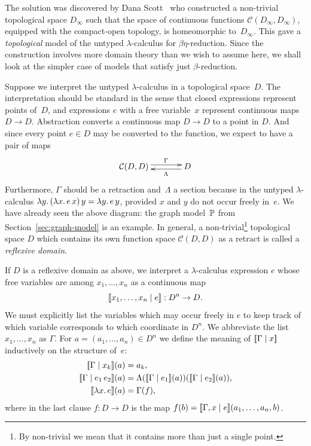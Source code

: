 The solution was discovered by Dana Scott~\cite{scott72:_contin_lattic} who
constructed a non-trivial topological space $D_\infty$ such that the
space of continuous functions $\mathcal{C}(D_\infty, D_\infty)$,
equipped with the compact-open topology, is homeomorphic
to~$D_\infty$. This gave a \emph{topological} model of the untyped
$\lambda$-calculus for $\beta\eta$-reduction. Since the construction
involves more domain theory than we wish to assume here, we shall look
at the simpler case of models that satisfy just $\beta$-reduction.

Suppose we interpret the untyped $\lambda$-calculus in a topological
space~$D$. The interpretation should be standard in the sense that
closed expressions represent points of~$D$, and expressions $e$ with a
free variable~$x$ represent continuous maps $D \to D$. Abstraction
converts a continuous map $D \to D$ to a point in $D$. And since every
point $e \in D$ may be converted to the function, we expect to have a
pair of maps
%
\begin{equation*}
  \xymatrix{
    **[l]{\mathcal{C}(D, D)}
    \ar@<+0.25em>[r]^{\Gamma}
    &
    {D}
    \ar@<+0.25em>[l]^{\Lambda}
  }
\end{equation*}
%
Furthermore, $\Gamma$ should be a retraction and~$\Lambda$ a section
because in the untyped $\lambda$-calculus
$\lambda y .\,(\lambda x .\,e\,x)\, y = \lambda y .\,e\,y$, provided $x$ and
$y$ do not occur freely in~$e$. We have already seen the above
diagram: the graph model~$\mathbb{P}$ from Section~\ref{sec:graph-model}
is an example. In general, a non-trivial\footnote{By non-trivial we
  mean that it contains more than just a single point.} topological
space $D$ which contains its own function space $\mathcal{C}(D,D)$ as
a retract is called a \emph{reflexive domain}.

If $D$ is a reflexive domain as above, we interpret a
$\lambda$-calculus expression $e$ whose free variables are among $x_1,
\ldots, x_n$ as a continuous map
%
\begin{equation*}
  [\![x_1, \ldots, x_n \mid e]\!] : D^n \to D.
\end{equation*}
%
We must explicitly list the variables which may occur freely in $e$ to
keep track of which variable corresponds to which coordinate in $D^n$.
We abbreviate the list $x_1, \ldots, x_n$ as $\Gamma$. For $a = (a_1,
\ldots, a_n) \in D^n$ we define the meaning of $[\![\Gamma \mid x]\!]$
inductively on the structure of~$e$:
%
\begin{align*}
  \sem{\Gamma \ctx x_k}(a) &= a_k, \\
  \sem{\Gamma \ctx e_1\, e_2}(a) &= 
  \Lambda(\sem{\Gamma \ctx e_1}(a))(\sem{\Gamma \ctx e_2}(a)), \\
  \sem{\xulam{x}{e}}(a) &= \Gamma(f),
\end{align*}
%
where in the last clause $f : D \to D$ is the map $f (b) =
[\![\Gamma, x \mid e]\!](a_1, \ldots, a_n, b)$.

